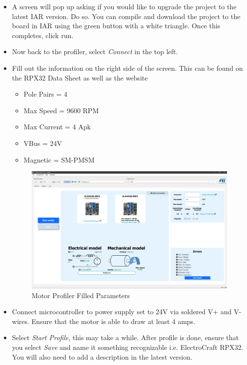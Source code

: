 \documentclass[10pt]{article}
\begin{document}
\begin{itemize}
                \item A screen will pop up asking if you would like to upgrade the project to the latest IAR version. Do so. You can compile and download the project to the board in IAR using the green button with a white triangle. Once this completes, click run. 
                \item Now back to the profiler, select \emph{Connect} in the top left.
                \item Fill out the information on the right side of the screen. This can be found on the RPX32 Data Sheet as well as the website
                    \begin{itemize}
                        \item Pole Pairs = 4
                        \item Max Speed = 9600 RPM
                        \item Max Current = 4 Apk
                        \item VBus = 24V
                        \item Magnetic = SM-PMSM
                    \end{itemize}
                    \begin{figure}[H]
                        \centerline{\includegraphics[width=\textwidth]{References/New Motor Profiler Parameters.png}}
                        \caption{Motor Profiler Filled Parameters}
                    \end{figure}
                \item Connect microcontroller to power supply set to 24V via soldered V+ and V- wires. Ensure that the motor is able to draw at least 4 amps.
                \item Select \emph{Start Profile}, this may take a while. After profile is done, ensure that you select \emph{Save} and name it something recognizable i.e. ElectroCraft RPX32. You will also need to add a description in the latest version.
            \end{itemize}
\end{document}
